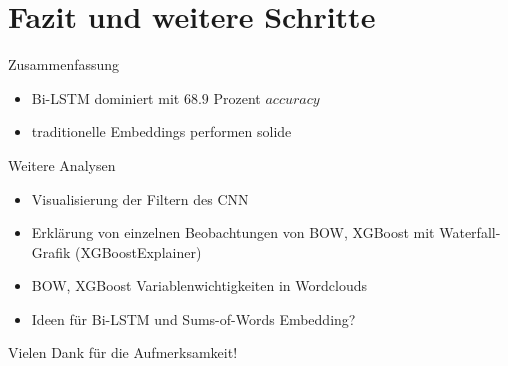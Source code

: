 \documentclass[8pt, xcolor = dvipsnames]{beamer}
\begin{document}
\section{Fazit und weitere Schritte}

\begin{frame}
\begin{block}{Zusammenfassung}
\begin{itemize}
    \item Bi-LSTM dominiert mit $68.9$ Prozent $accuracy$
    \item traditionelle Embeddings performen solide
\end{itemize}{}
\end{block}

\begin{block}{Weitere Analysen}
\begin{itemize}
\item Visualisierung der Filtern des CNN
\item Erklärung von einzelnen Beobachtungen von BOW, XGBoost mit Waterfall-Grafik (XGBoostExplainer)
\item BOW, XGBoost Variablenwichtigkeiten in Wordclouds
\item Ideen für Bi-LSTM und Sums-of-Words Embedding?
\end{itemize}{}
\end{block}{}

\end{frame}{}

\begin{frame}
\centering
    \Large{Vielen Dank für die Aufmerksamkeit!}
\end{frame}{}
\end{document}
